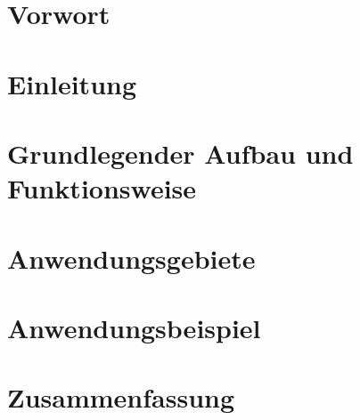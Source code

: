 \documentclass{article}
\begin{document}
    

    \tableofcontents
    \thispagestyle{empty}
    \newpage


    \section{Vorwort}
    
    \newpage

    \section{Einleitung}
    
    \newpage

    \section{Grundlegender Aufbau und Funktionsweise}
    
    \newpage

    \section{Anwendungsgebiete}
    
    \newpage

    \section{Anwendungsbeispiel}
    
    \newpage

    \section{Zusammenfassung}
    \newpage

    
\end{document}
